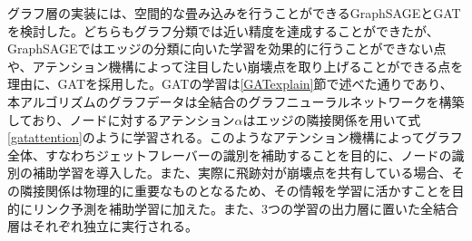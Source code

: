 グラフ層の実装には、空間的な畳み込みを行うことができるGraphSAGEとGATを検討した。どちらもグラフ分類では近い精度を達成することができたが、GraphSAGEではエッジの分類に向いた学習を効果的に行うことができない点や、アテンション機構によって注目したい崩壊点を取り上げることができる点を理由に、GATを採用した。GATの学習は\ref{GATexplain}節で述べた通りであり、本アルゴリズムのグラフデータは全結合のグラフニューラルネットワークを構築しており、ノードに対するアテンション$\alpha$はエッジの隣接関係を用いて式\ref{gatattention}のように学習される。このようなアテンション機構によってグラフ全体、すなわちジェットフレーバーの識別を補助することを目的に、ノードの識別の補助学習を導入した。また、実際に飛跡対が崩壊点を共有している場合、その隣接関係は物理的に重要なものとなるため、その情報を学習に活かすことを目的にリンク予測を補助学習に加えた。また、3つの学習の出力層に置いた全結合層はそれぞれ独立に実行される。

